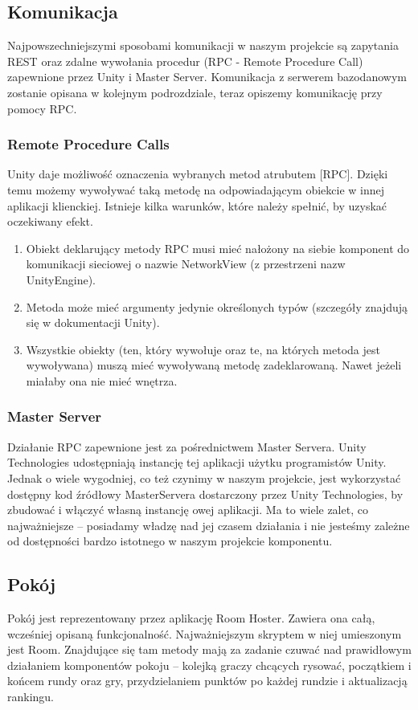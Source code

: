 \subsection{Komunikacja}
Najpowszechniejszymi sposobami komunikacji w naszym projekcie są zapytania REST oraz zdalne wywołania procedur (RPC - Remote Procedure Call) zapewnione przez Unity i Master Server. 
Komunikacja z serwerem bazodanowym zostanie opisana w kolejnym podrozdziale, teraz opiszemy komunikację przy pomocy RPC.

\subsubsection{Remote Procedure Calls}
Unity daje możliwość oznaczenia wybranych metod atrubutem [RPC]. Dzięki temu możemy wywoływać taką metodę na odpowiadającym obiekcie w innej aplikacji klienckiej. Istnieje kilka warunków, które należy spełnić, by uzyskać oczekiwany efekt.
\begin{enumerate}
    \item Obiekt deklarujący metody RPC musi mieć nałożony na siebie komponent do komunikacji sieciowej o nazwie NetworkView (z przestrzeni nazw UnityEngine).
    \item Metoda może mieć argumenty jedynie określonych typów (szczegóły znajdują się w dokumentacji Unity).
    \item Wszystkie obiekty (ten, który wywołuje oraz te, na których metoda jest wywoływana) muszą mieć wywoływaną metodę zadeklarowaną. Nawet jeżeli miałaby ona nie mieć wnętrza.
\end{enumerate}

\subsubsection{Master Server}
Działanie RPC zapewnione jest za pośrednictwem Master Servera. Unity Technologies udostępniają instancję tej aplikacji użytku programistów Unity. Jednak o wiele wygodniej, co też czynimy w naszym projekcie, jest wykorzystać dostępny kod źródłowy MasterServera dostarczony przez Unity Technologies, by zbudować i włączyć własną instancję owej aplikacji. Ma to wiele zalet, co najważniejsze – posiadamy władzę nad jej czasem działania i nie jesteśmy zależne od dostępności bardzo istotnego w naszym projekcie komponentu.

\subsection{Pokój}
Pokój jest reprezentowany przez aplikację Room Hoster. Zawiera ona całą, wcześniej opisaną funkcjonalność. Najważniejszym skryptem w niej umieszonym jest Room. Znajdujące się tam metody mają za zadanie czuwać nad prawidłowym działaniem komponentów pokoju – kolejką graczy chcących rysować, początkiem i końcem rundy oraz gry, przydzielaniem punktów po każdej rundzie i aktualizacją rankingu.


